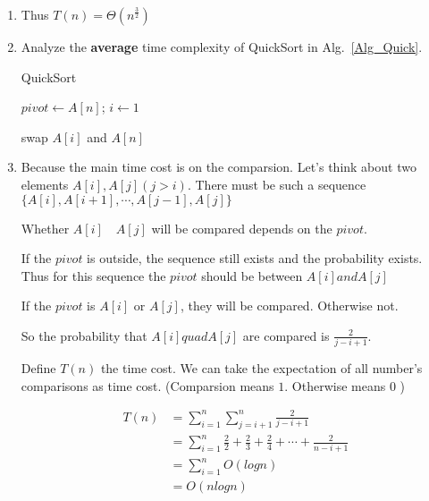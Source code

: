 \documentclass[12pt,a4paper]{article}
\makeatletter
\newtheorem*{solution}{Solution}
\theoremstyle{definition}
\renewenvironment{solution}[1][Solution] {\par\pushQED{\qed}\normalfont\topsep6\p@\@plus6\p@\relax\trivlist\item[\hskip\labelsep\bfseries#1\@addpunct{.}]\ignorespaces}{\popQED\endtrivlist\@endpefalse} \makeatother
\makeatother
\begin{document}
\begin{enumerate}
\begin{solution}
          Thus $T(n)=\Theta(n^{\frac {3}{2}})$
   \end{solution}

    \item
    Analyze the \textbf{average} time complexity of QuickSort in Alg.~\ref{Alg_Quick}.

    \begin{minipage}[t]{0.8\textwidth}
    \begin{algorithm}[H]

      \BlankLine
      \caption{QuickSort}\label{Alg_Quick}


      $pivot \leftarrow A[n]$; $i \leftarrow 1$\;

      swap $A[i]$ and $A[n]$\;
    \end{algorithm}
    \end{minipage}

   \begin{solution}
       Because the main time cost is on the comparsion. Let's think about 
       two elements $A[i],A[j] (j>i)$. There must be such a sequence $\{A[i],A[i+1],\cdots,A[j-1],A[j]\}$

       Whether $A[i] \quad A[j]$ will be compared depends on the $pivot$.

       If the $pivot$ is outside, the sequence still exists and the probability exists. Thus for this sequence the $pivot$ should be between $A[i] and A[j]$

       If the $pivot$ is $A[i]$ or $A[j]$, they will be compared. Otherwise not.

       So the probability that $A[i] quad A[j]$ are compared is $\frac{2}{j-i+1}$.

       Define $T(n)$ the time cost. We can take the expectation of all number's comparisons as time cost. (Comparsion means $1$. Otherwise means $0$ )

       \begin{align*}
        T(n) &= \sum_{i=1}^{n} \sum_{j=i+1}^{n} \frac{2}{j-i+1}\\
            &=  \sum_{i=1}^{n} \frac{2}{2}+\frac{2}{3}+\frac{2}{4}+\cdots+\frac{2}{n-i+1}\\  
            &=  \sum_{i=1}^{n} O (logn)\\  
            &=  O(nlogn)
           \end{align*}


\end{solution}
\end{enumerate}
\end{document}
